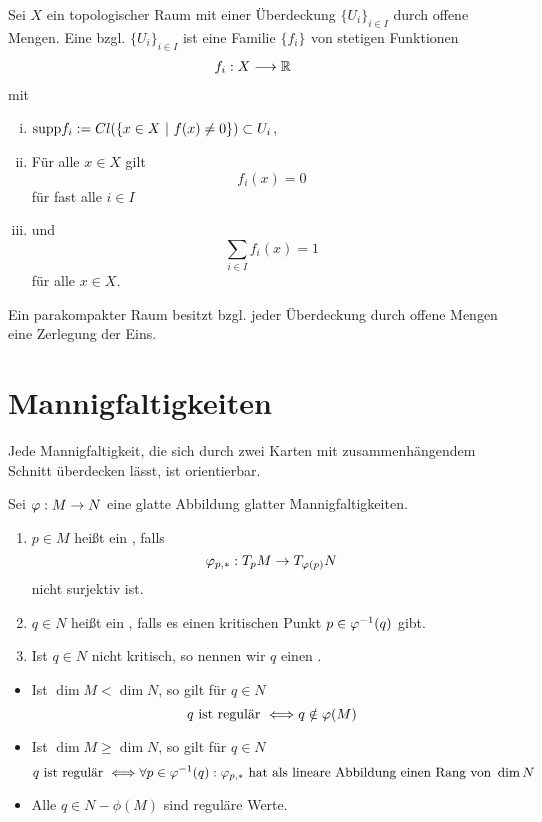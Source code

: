 \Def{}
Sei $X$ ein topologischer Raum mit einer Überdeckung $\{U_i\}_{i\in I}$ durch offene Mengen. Eine  bzgl. $\{U_i\}_{i\in I}$ ist eine Familie $\{f_i\}_{}$ von stetigen Funktionen
\begin{align*}
f_i : X & \overset{}{\longrightarrow} \mathbb{R}
\end{align*}
mit
\begin{enumerate}[i.)]
	\item $\supp f_i := Cl(\set{x\in X}{f(x) \neq 0}) \subset U_i$,
	\item Für alle $x \in X$ gilt
	\[ f_i(x) = 0 \]
	für fast alle $i \in I$
	\item und
	\[\sum_{i\in I}f_i(x) = 1\]
	für alle $x \in X$.
\end{enumerate}

\Satz{}
Ein parakompakter Raum besitzt bzgl. jeder Überdeckung durch offene Mengen eine Zerlegung der Eins.

\section{Mannigfaltigkeiten}
\Prop{}
Jede Mannigfaltigkeit, die sich durch zwei Karten mit zusammenhängendem Schnitt überdecken lässt, ist orientierbar.


\Def{}
Sei $\varphi : M \overset{}{\rightarrow} N$ eine glatte Abbildung glatter Mannigfaltigkeiten.
\begin{enumerate}[1.)]
	\item $p \in M$ heißt ein , falls
	\[\varphi_{p,*} : T_pM \overset{}{\rightarrow} T_{\varphi(p)}N\]
	nicht surjektiv ist.
	\item $q \in N$ heißt ein , falls es einen kritischen Punkt $p\in \varphi^{-1}(q)$ gibt.
	\item Ist $q \in N$ nicht kritisch, so nennen wir $q$ einen . 
\end{enumerate}
\Bem{}
\begin{itemize}
	\item Ist $\dim M < \dim N$, so gilt für $q \in N$
	\[q \text{ ist regulär } \overset{}{\Longleftrightarrow} q \notin \varphi(M) \]
	\item Ist $\dim M \geq \dim N$, so gilt für $q \in N$
	\[ q \text{ ist regulär } \overset{}{\Longleftrightarrow} \forall p \in \varphi^{-1}(q): \varphi_{p,*} \text{ hat als lineare Abbildung einen Rang von } \dim N \]
	\item Alle $q\in N - \phi(M)$ sind reguläre Werte.
\end{itemize}

